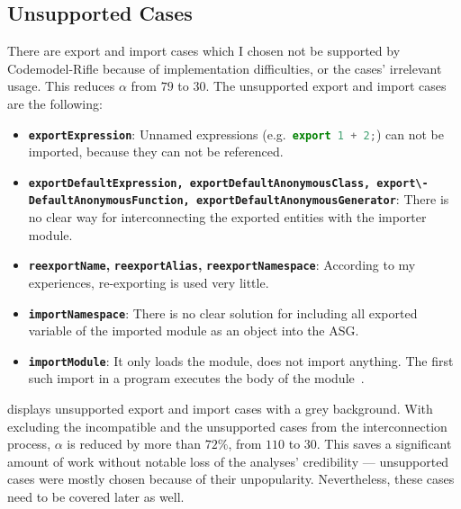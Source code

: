 \subsection{Unsupported Cases}

There are export and import cases which I chosen not be supported by Codemodel-Rifle because of implementation difficulties, or the cases' irrelevant usage. This reduces $\alpha$ from $79$ to $30$. The unsupported export and import cases are the following:

\begin{itemize}
\item \textbf{\lstinline{exportExpression}}: Unnamed expressions (e.g.\ \lstinline[language=JavaScript]{export 1 + 2;}) can not be imported, because they can not be referenced.
\item \textbf{\lstinline{exportDefaultExpression, exportDefaultAnonymousClass, export\- DefaultAnonymousFunction, exportDefaultAnonymousGenerator}}: There is no clear way for interconnecting the exported entities with the importer module.
\item \textbf{\lstinline{reexportName},} \textbf{\lstinline{reexportAlias},} \textbf{\lstinline{reexportNamespace}}: According to my experiences, re-exporting is used very little.
\item \textbf{\lstinline{importNamespace}}: There is no clear solution for including all exported variable of the imported module as an object into the ASG.
\item \textbf{\lstinline{importModule}}: It only loads the module, does not import anything. The first such import in a program executes the body of the module~\cite{exploringes6}.
\end{itemize}

 displays unsupported export and import cases with a grey background. With excluding the incompatible and the unsupported cases from the interconnection process, $\alpha$ is reduced by more than $72\%$, from $110$ to $30$. This saves a significant amount of work without notable loss of the analyses' credibility — unsupported cases were mostly chosen because of their unpopularity. Nevertheless, these cases need to be covered later as well.

